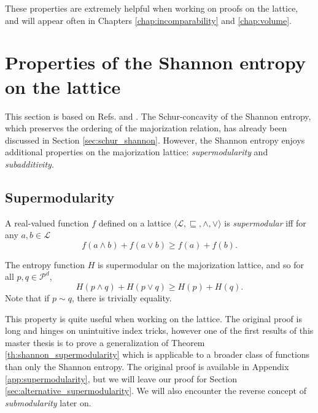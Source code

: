 
These properties are extremely helpful when working on proofs on the lattice, and will appear often in Chapters \ref{chap:incomparability} and \ref{chap:volume}.



\section{Properties of the Shannon entropy on the lattice}

This section is based on Refs. \cite{cicalese_supermodularity_2002} and \cite{cicalese_information_2013}. The Schur-concavity of the Shannon entropy, which preserves the ordering of the majorization relation, has already been discussed in Section \ref{sec:schur_shannon}. However, the Shannon entropy enjoys additional properties on the majorization lattice: \textit{supermodularity} and \textit{subadditivity}.



\subsection{Supermodularity} \label{sec:supermodularity}

\begin{definition} \label{def:supermodularity}
    A real-valued function $f$ defined on a lattice $\langle \mathcal{L}, \sqsubseteq, \wedge, \vee \rangle$ is \textit{supermodular} iff for any $a, b \in \mathcal{L}$
    \begin{equation}
        f(a \wedge b) + f(a \vee b) \geq f(a) + f(b).
    \end{equation}
\end{definition}


\begin{theorem} \label{th:shannon_supermodularity}
    The entropy function $H$ is supermodular on the majorization lattice, and so for all $p, q \in \mathcal{P}^d$,
    \begin{equation} \label{eq:supermodularity_shannon}
        H(p \wedge q) + H(p \vee q) \geq H(p) + H(q).
    \end{equation}
    Note that if $p \sim q$, there is trivially equality.
\end{theorem}

This property is quite useful when working on the lattice. The original proof is long and hinges on unintuitive index tricks, however one of the first results of this master thesis is to prove a generalization of Theorem \ref{th:shannon_supermodularity} which is applicable to a broader class of functions than only the Shannon entropy. The original proof is available in Appendix \ref{app:supermodularity}, but we will leave our proof for Section \ref{sec:alternative_supermodularity}. We will also encounter the reverse concept of \textit{submodularity} later on.

